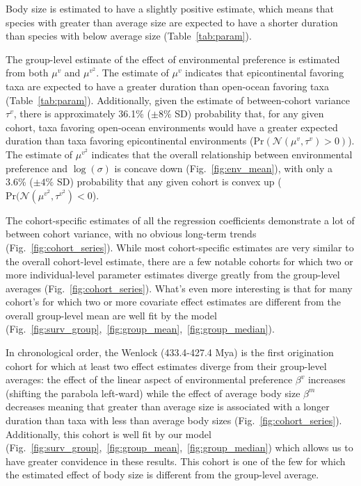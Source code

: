 \documentclass[11pt]{article}
\begin{document}
Body size is estimated to have a slightly positive estimate, which means that species with greater than average size are expected to have a shorter duration than species with below average size (Table~\ref{tab:param}).

The group-level estimate of the effect of environmental preference is estimated from both \(\mu^{v}\) and \(\mu^{v^{2}}\). The estimate of \(\mu^{v}\) indicates that epicontinental favoring taxa are expected to have a greater duration than open-ocean favoring taxa (Table~\ref{tab:param}). Additionally, given the estimate of between-cohort variance \(\tau^{v}\), there is approximately 36.1\% (\(\pm 8\%\) SD) probability that, for any given cohort, taxa favoring open-ocean environments would have a greater expected duration than taxa favoring epicontinental environments (\(\mathrm{Pr}(\mathcal{N}(\mu^{v}, \tau^{v}) > 0)\)). The estimate of \(\mu^{v^{2}}\) indicates that the overall relationship between environmental preference and \(\log(\sigma)\) is concave down (Fig.~\ref{fig:env_mean}), with only a 3.6\% (\(\pm 4\%\) SD) probability that any given cohort is convex up (\(\mathrm{Pr}(\mathcal{N}(\mu^{v^{2}}, \tau^{v^{2}}) < 0\)).

The cohort-specific estimates of all the regression coefficients demonstrate a lot of between cohort variance, with no obvious long-term trends (Fig.~\ref{fig:cohort_series}). While most cohort-specific estimates are very similar to the overall cohort-level estimate, there are a few notable cohorts for which two or more individual-level parameter estimates diverge greatly from the group-level averages (Fig.~\ref{fig:cohort_series}). What's even more interesting is that for many cohort's for which two or more covariate effect estimates are different from the overall group-level mean are well fit by the model (Fig.~\ref{fig:surv_group},~\ref{fig:group_mean},~\ref{fig:group_median}).

In chronological order, the Wenlock (433.4-427.4 Mya) is the first origination cohort for which at least two effect estimates diverge from their group-level averages: the effect of the linear aspect of environmental preference \(\beta^{v}\) increases (shifting the parabola left-ward) while the effect of average body size \(\beta^{m}\) decreases meaning that greater than average size is associated with a longer duration than taxa with less than average body sizes (Fig.~\ref{fig:cohort_series}). Additionally, this cohort is well fit by our model (Fig.~\ref{fig:surv_group},~\ref{fig:group_mean},~\ref{fig:group_median}) which allows us to have greater convidence in these results. This cohort is one of the few for which the estimated effect of body size is different from the group-level average.
\end{document}
